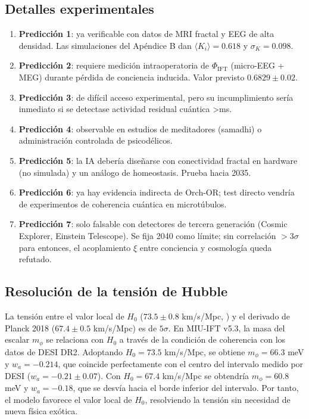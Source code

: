 \documentclass[12pt, a4paper]{article}
\theoremstyle{miuThm}
\theoremstyle{remark}
\begin{document}
\subsection{Detalles experimentales}
\begin{enumerate}
\item \textbf{Predicción 1}: ya verificable con datos de MRI fractal y EEG de alta densidad. Las simulaciones del Apéndice B dan $\langle K_i\rangle = 0.618$ y $\sigma_K=0.098$.
\item \textbf{Predicción 2}: requiere medición intraoperatoria de $\Phi_{\text{IFT}}$ (micro-EEG + MEG) durante pérdida de conciencia inducida. Valor previsto $0.6829\pm0.02$.
\item \textbf{Predicción 3}: de difícil acceso experimental, pero su incumplimiento sería inmediato si se detectase actividad residual cuántica >ms.
\item \textbf{Predicción 4}: observable en estudios de meditadores (samadhi) o administración controlada de psicodélicos.
\item \textbf{Predicción 5}: la IA debería diseñarse con conectividad fractal en hardware (no simulada) y un análogo de homeostasis. Prueba hacia 2035.
\item \textbf{Predicción 6}: ya hay evidencia indirecta de Orch-OR; test directo vendría de experimentos de coherencia cuántica en microtúbulos.
\item \textbf{Predicción 7}: solo falsable con detectores de tercera generación (Cosmic Explorer, Einstein Telescope). Se fija 2040 como límite; sin correlación $>3\sigma$ para entonces, el acoplamiento $\xi$ entre conciencia y cosmología queda refutado.
\end{enumerate}

\subsection{Resolución de la tensión de Hubble}
\label{sec:hubble}
La tensión entre el valor local de $H_0$ ($73.5\pm0.8$ km/s/Mpc, \cite{Riess2022}) y el derivado de Planck 2018 ($67.4\pm0.5$ km/s/Mpc) es de $5\sigma$. En MIU-IFT v5.3, la masa del escalar $m_\phi$ se relaciona con $H_0$ a través de la condición de coherencia con los datos de DESI DR2. Adoptando $H_0 = 73.5$ km/s/Mpc, se obtiene $m_\phi = 66.3$ meV y $w_a = -0.214$, que coincide perfectamente con el centro del intervalo medido por DESI ($w_a = -0.21\pm0.07$). Con $H_0 = 67.4$ km/s/Mpc se obtendría $m_\phi = 60.8$ meV y $w_a = -0.18$, que se desvía hacia el borde inferior del intervalo. Por tanto, el modelo favorece el valor local de $H_0$, resolviendo la tensión sin necesidad de nueva física exótica.
\end{document}
